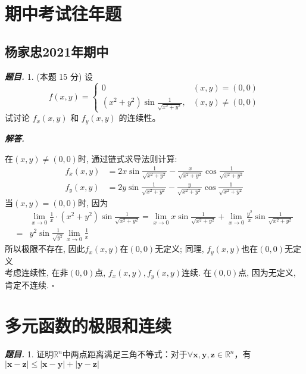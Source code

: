 \documentclass[10pt, a4paper, oneside]{ctexart}
\newenvironment{problem}{\begin{framed}\par\noindent\textbf{\textit{题目. }}}{\end{framed}\par}
\newenvironment{solution}{%
  \par\noindent\textbf{\textit{解答. }}\ignorespaces
}{%
  \hfill\ensuremath{\square}\par %
}
\begin{document}
\section{期中考试往年题}

\subsection{杨家忠2021年期中}

\begin{problem}
1. (本题 15 分) 设
$$
f(x, y)= \begin{cases}0 & (x, y)=(0,0) \\ \left(x^2+y^2\right) \sin \frac{1}{\sqrt{x^2+y^2}}, & (x, y) \neq(0,0)\end{cases}
$$
试讨论 $f_x(x, y)$ 和 $f_y(x, y)$ 的连续性。
\end{problem}

\begin{solution}
在$(x,y)\neq (0,0)$时, 通过链式求导法则计算:
\begin{align*}
    f_{x}(x,y)&=2x\sin \frac{1}{\sqrt{x^2+y^2}} - \frac{x}{\sqrt{x^2+y^2}}\cos \frac{1}{\sqrt{x^2+y^2}}\\
    f_{y}(x,y)&=2y\sin \frac{1}{\sqrt{x^2+y^2}} - \frac{y}{\sqrt{x^2+y^2}}\cos \frac{1}{\sqrt{x^2+y^2}}
\end{align*}
当$(x,y)=(0,0)$时, 因为
\begin{align*}
    &\lim_{x\to 0} \frac{1}{x}\cdot \left(x^2+y^2\right) \sin \frac{1}{\sqrt{x^2+y^2}}=\lim_{x\to 0} x\sin \frac{1}{\sqrt{x^2+y^2}} + \lim_{x\to 0} \frac{y^2}{x}\sin \frac{1}{\sqrt{x^2+y^2}} \\
    =&y^2\sin \frac{1}{\sqrt{y^2}}\lim_{x\to 0} \frac{1}{x}
\end{align*}
所以极限不存在, 因此$f_x(x,y)$在$(0,0)$无定义; 同理, $f_y(x,y)$也在$(0,0)$无定义\\
考虑连续性, 在非$(0,0)$点,  $f_x(x,y), f_y(x,y)$连续. 在$(0,0)$点, 因为无定义, 肯定不连续.
\end{solution}

\section{多元函数的极限和连续}

\begin{problem}
1. 证明$\mathbb{R}^n$中两点距离满足三角不等式：对于$\forall \bm{x},\bm{y},\bm{z}\in \mathbb{R}^n$，有$|\bm{x}-\bm{z}|\leq |\bm{x}-\bm{y}|+|\bm{y}-\bm{z}|$
\end{problem}
\end{document}
